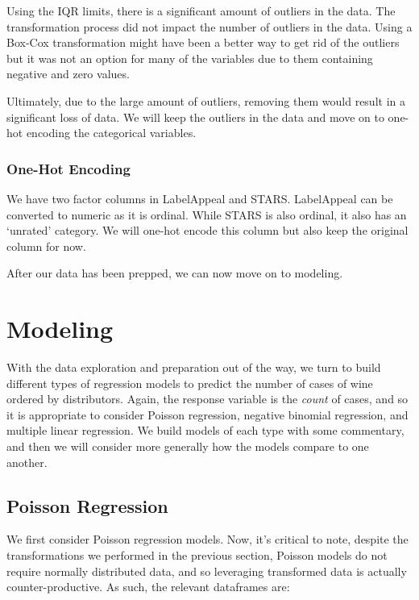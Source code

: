 \documentclass[
]{article}
\begin{document}
Using the IQR limits, there is a significant amount of outliers in the
data. The transformation process did not impact the number of outliers
in the data. Using a Box-Cox transformation might have been a better way
to get rid of the outliers but it was not an option for many of the
variables due to them containing negative and zero values.

Ultimately, due to the large amount of outliers, removing them would
result in a significant loss of data. We will keep the outliers in the
data and move on to one-hot encoding the categorical variables.

\subsubsection{One-Hot Encoding}\label{one-hot-encoding}

We have two factor columns in LabelAppeal and STARS. LabelAppeal can be
converted to numeric as it is ordinal. While STARS is also ordinal, it
also has an `unrated' category. We will one-hot encode this column but
also keep the original column for now.

After our data has been prepped, we can now move on to modeling.

\section{Modeling}\label{modeling}

With the data exploration and preparation out of the way, we turn to
build different types of regression models to predict the number of
cases of wine ordered by distributors. Again, the response variable is
the \emph{count} of cases, and so it is appropriate to consider Poisson
regression, negative binomial regression, and multiple linear
regression. We build models of each type with some commentary, and then
we will consider more generally how the models compare to one another.

\subsection{Poisson Regression}\label{poisson-regression}

We first consider Poisson regression models. Now, it's critical to note,
despite the transformations we performed in the previous section,
Poisson models do not require normally distributed data, and so
leveraging transformed data is actually counter-productive. As such, the
relevant dataframes are:
\end{document}
